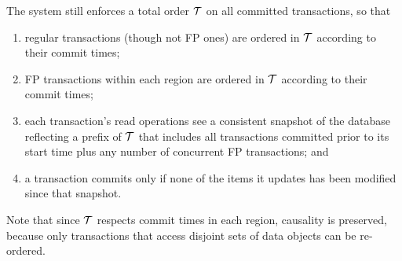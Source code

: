 The system still enforces a total order ${\cal T}$ on all committed transactions, so that
\begin{enumerate}
    \setlength{\itemsep}{0pt}
    \setlength{\parskip}{0pt}
    \setlength{\parsep}{2pt}  
\item
regular transactions (though not FP ones) are ordered in ${\cal T}$  according to their commit times;
\item
FP transactions within each region are ordered in ${\cal T}$  according to their commit times;
\item
each transaction's read operations see a consistent snapshot of the database reflecting 
a prefix of  ${\cal T}$ that includes all transactions committed prior to
its start time plus any number of concurrent FP transactions; and 
\item
 a transaction commits only if none of the items it updates has been modified since that snapshot.
 \end{enumerate}

Note that since ${\cal T}$  respects commit times in each region, causality is preserved, because 
only transactions that  access disjoint  sets of data objects can be re-ordered.


